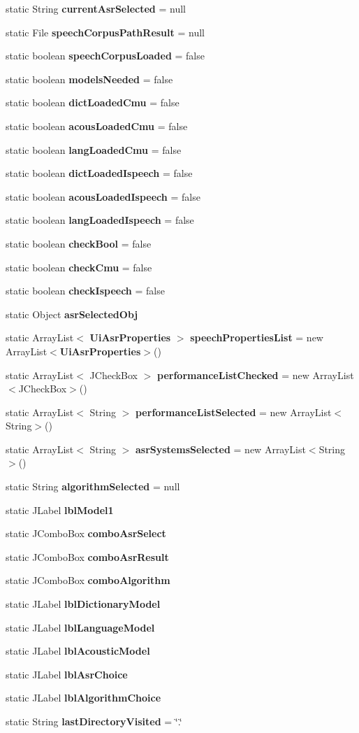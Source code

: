 \begin{DoxyCompactItemize}
static String {\bf current\+Asr\+Selected} = null
\item 
static File {\bf speech\+Corpus\+Path\+Result} = null
\item 
static boolean {\bf speech\+Corpus\+Loaded} = false
\item 
static boolean {\bf models\+Needed} = false
\item 
static boolean {\bf dict\+Loaded\+Cmu} = false
\item 
static boolean {\bf acous\+Loaded\+Cmu} = false
\item 
static boolean {\bf lang\+Loaded\+Cmu} = false
\item 
static boolean {\bf dict\+Loaded\+Ispeech} = false
\item 
static boolean {\bf acous\+Loaded\+Ispeech} = false
\item 
static boolean {\bf lang\+Loaded\+Ispeech} = false
\item 
static boolean {\bf check\+Bool} = false
\item 
static boolean {\bf check\+Cmu} = false
\item 
static boolean {\bf check\+Ispeech} = false
\item 
static Object {\bf asr\+Selected\+Obj}
\item 
static Array\+List$<$ {\bf Ui\+Asr\+Properties} $>$ {\bf speech\+Properties\+List} = new Array\+List$<${\bf Ui\+Asr\+Properties}$>$()
\item 
static Array\+List$<$ J\+Check\+Box $>$ {\bf performance\+List\+Checked} = new Array\+List$<$J\+Check\+Box$>$()
\item 
static Array\+List$<$ String $>$ {\bf performance\+List\+Selected} = new Array\+List$<$String$>$()
\item 
static Array\+List$<$ String $>$ {\bf asr\+Systems\+Selected} = new Array\+List$<$String$>$()
\item 
static String {\bf algorithm\+Selected} = null
\item 
static J\+Label {\bf lbl\+Model1}
\item 
static J\+Combo\+Box {\bf combo\+Asr\+Select}
\item 
static J\+Combo\+Box {\bf combo\+Asr\+Result}
\item 
static J\+Combo\+Box {\bf combo\+Algorithm}
\item 
static J\+Label {\bf lbl\+Dictionary\+Model}
\item 
static J\+Label {\bf lbl\+Language\+Model}
\item 
static J\+Label {\bf lbl\+Acoustic\+Model}
\item 
static J\+Label {\bf lbl\+Asr\+Choice}
\item 
static J\+Label {\bf lbl\+Algorithm\+Choice}
\item 
static String {\bf last\+Directory\+Visited} = \char`\"{}.\char`\"{}
\end{DoxyCompactItemize}


